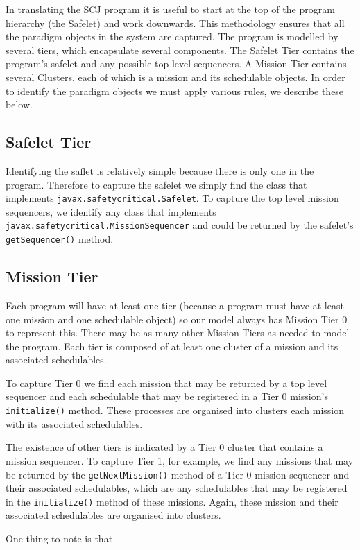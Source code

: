 In translating the SCJ program it is useful to start at the top of the program hierarchy (the Safelet) and work downwards. This methodology ensures that all the paradigm objects in the system are captured. The program is modelled by several tiers, which encapsulate several components. The Safelet Tier contains the program's safelet and any possible top level sequencers. A Mission Tier contains several Clusters, each of which is a mission and its schedulable objects. In order to identify the paradigm objects we must apply various rules, we describe these below.

\subsection{Safelet Tier}

Identifying the saflet is relatively simple because there is only one in the program. Therefore to capture the safelet we simply find the class that implements \texttt{javax.safetycritical.Safelet}. To capture the top level mission sequencers, we identify any class that implements \texttt{javax.safetycritical.MissionSequencer} and could be returned by the safelet's \texttt{getSequencer()} method. 

\subsection{Mission Tier}

Each program will have at least one tier (because a program must have at least one mission and one schedulable object) so our model always has Mission Tier 0 to represent this. There may be as many other Mission Tiers as needed to model the program. Each tier is composed of at least one cluster of a mission and its associated schedulables.

To capture Tier 0 we find each mission that may be returned by a top level sequencer and each schedulable that may be registered in a Tier 0 mission's \texttt{initialize()} method. These processes are organised into clusters each mission with its associated schedulables. 

The existence of other tiers is indicated by a Tier 0 cluster that contains a mission sequencer. To capture Tier 1, for example, we find any missions that may be returned by the \texttt{getNextMission()} method of a Tier 0 mission sequencer and their associated schedulables, which are any schedulables that may be registered in the \texttt{initialize()} method of these missions. Again, these mission and their associated schedulables are organised into clusters.  

One thing to note is that 